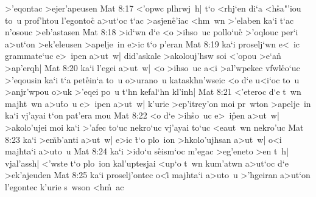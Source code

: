 >'eqontac
>ejer'apeusen\bibvsend
\vs Mat 8:17
<'opwc
plhrwj~h|
t`o
<rhj`en
di`a
<h\r{s}a"'iou
to~u
prof'htou
l'egonto\r{c}
a>ut`oc
t`ac
>asjen\r{e}'iac
<hm~wn
>'elaben
ka`i
t`ac
n'osouc
>eb'astasen\bibvsend
\vs Mat 8:18
>id`wn
d`e
<o
>ihso~uc
pollo`uc\r{}
>'oqlouc
per`i
a>ut`on
>ek'eleusen
>apelje~in
e>ic
t`o
p'eran\bibvsend
\vs Mat 8:19
ka`i
proselj`wn
e<~ic
grammate`uc
e>~ipen
a>ut~w|
did'askale
>akolouj'hsw
soi
<'opou
>e`a\r{n}
>ap'erqh|\bibvsend
\vs Mat 8:20
ka`i
l'egei
a>ut~w|
<o
>ihso~uc
a<i
>al'wpekec
vfwl\r{e}o`uc
>'eqousin
ka`i
t`a
pet\r{e}in`a
to~u
o>urano~u
kataskhn'wseic
<o
d`e
u<i`oc
to~u
>anjr'wpou
o>uk
>'eqei
po~u
t`hn
kefal`hn
kl'inh|\bibvsend
\vs Mat 8:21
<'eteroc
d`e
t~wn
majht~wn
a>u\r{t}o~u
e>~ipen
a>ut~w|
k'urie
>ep'itrey'on
moi
pr~wton
>apelje~in
ka`i
vj'ayai
t`on
pat'era
mou\bibvsend
\vs Mat 8:22
<o
d`e
>ih\r{s}o~uc
e>~i\r{p}en
a>ut~w|
>akolo'ujei
moi
ka`i
>'afec
to`uc
nekro`uc
vj'ayai
to`uc
<eaut~wn
nekro'uc\bibvsend
\vs Mat 8:23
ka`i
>e\r{m}b'anti
a>ut~w|
e>ic
\r{t}`o
plo~ion
>hkolo'ujhsan
a>ut~w|
o<i
majhta`i
a>uto~u\bibvsend
\vs Mat 8:24
ka`i
>ido`u
s\r{e}ism`oc
m'egac
>eg'eneto
>en
t~h|
vjal'assh|
<'wste
t`o
plo~ion
kal'uptesjai
<up`o
t~wn
kum'atwn
a>ut`oc
d`e
>ek'ajeuden\bibvsend
\vs Mat 8:25
ka`i
proselj'ontec
o<i\r{}
majhta`i
a>uto~u
>'hgeiran
a>ut`on
l'egontec
k'urie
s~wson
<h\r{m}~ac
